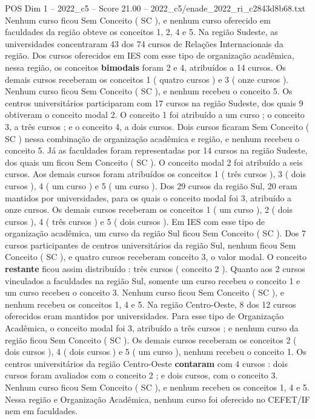 \begin{textsample}{POS Dim 1 – 2022\_c5 – Score 21.00 – 2022\_c5/enade\_2022\_ri\_c2843d8b68.txt}
Nenhum curso ficou Sem Conceito ( SC ), e nenhum curso oferecido em faculdades da região obteve os conceitos 1, 2, 4 e 5.
Na região Sudeste, as universidades concentraram 43 dos 74 cursos de Relações Internacionais da região.
Dos cursos oferecidos em IES com esse tipo de organização acadêmica, nessa região, os conceitos \textbf{bimodais} foram 2 e 4, atribuídos a 14 cursos.
Os demais cursos receberam os conceitos 1 ( quatro cursos ) e 3 ( onze cursos ).
Nenhum curso ficou Sem Conceito ( SC ), e nenhum recebeu o conceito 5.
Os centros universitários participaram com 17 cursos na região Sudeste, dos quais 9 obtiveram o conceito modal 2.
O conceito 1 foi atribuído a um curso ; o conceito 3, a três cursos ; e o conceito 4, a dois cursos.
Dois cursos ficaram Sem Conceito ( SC ) nessa combinação de organização acadêmica e região, e nenhum recebeu o conceito 5.
Já as faculdades foram representadas por 14 cursos na região Sudeste, dos quais um ficou Sem Conceito ( SC ).
O conceito modal 2 foi atribuído a seis cursos.
Aos demais cursos foram atribuídos os conceitos 1 ( três cursos ), 3 ( dois cursos ), 4 ( um curso ) e 5 ( um curso ).
Dos 29 cursos da região Sul, 20 eram mantidos por universidades, para os quais o conceito modal foi 3, atribuído a onze cursos.
Os demais cursos receberam os conceitos 1 ( um curso ), 2 ( dois cursos ), 4 ( três cursos ) e 5 ( dois cursos ).
Em IES com esse tipo de organização acadêmica, um curso da região Sul ficou Sem Conceito ( SC ).
Dos 7 cursos participantes de centros universitários da região Sul, nenhum ficou Sem Conceito ( SC ), e quatro cursos receberam conceito 3, o valor modal.
O conceito \textbf{restante} ficou assim distribuído : três cursos ( conceito 2 ).
Quanto aos 2 cursos vinculados a faculdades na região Sul, somente um curso recebeu o conceito 1 e um curso recebeu o conceito 3.
Nenhum curso ficou Sem Conceito ( SC ), e nenhum recebeu os conceitos 1, 4 e 5.
Na região Centro-Oeste, 8 dos 12 cursos oferecidos eram mantidos por universidades.
Para esse tipo de Organização Acadêmica, o conceito modal foi 3, atribuído a três cursos ; e nenhum curso da região ficou Sem Conceito ( SC ).
Os demais cursos receberam os conceitos 2 ( dois cursos ), 4 ( dois cursos ) e 5 ( um curso ), nenhum recebeu o conceito 1.
Os centros universitários da região Centro-Oeste \textbf{contaram} com 4 cursos : dois cursos foram avaliados com o conceito 2 ; e dois cursos, com o conceito 3.
Nenhum curso ficou Sem Conceito ( SC ), e nenhum recebeu os conceitos 1, 4 e 5.
Nessa região e Organização Acadêmica, nenhum curso foi oferecido no CEFET/IF nem em faculdades.

\end{textsample}
